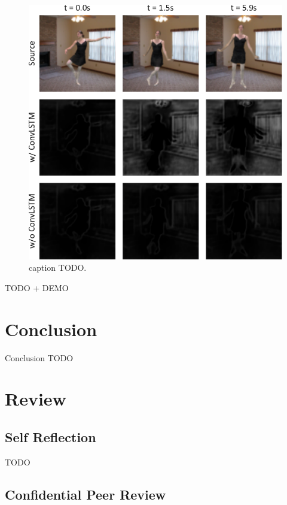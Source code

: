 \documentclass[final]{cvpr}
\begin{document}
\begin{figure}[htb]
    \begin{center}
        \includegraphics[width=1\linewidth]{img/ablationStudy.pdf}
    \end{center}
    \caption{caption TODO.}
    \label{ablationStudy}
\end{figure}

TODO + DEMO

\section{Conclusion}

Conclusion TODO




\section{Review}

\subsection{Self Reflection}

TODO

\subsection{Confidential Peer Review}
\end{document}

